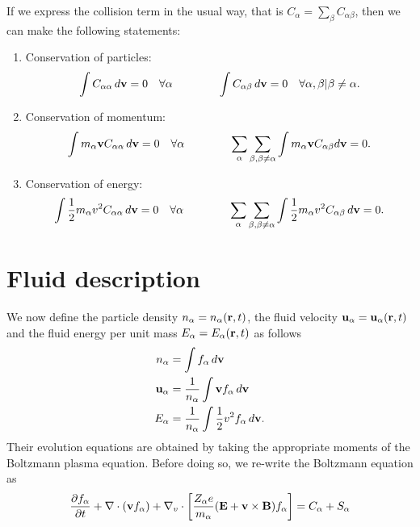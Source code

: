 \documentclass[a4paper,11pt]{report}
\begin{document}
If we express the collision term in the usual way, that is $C_\alpha = \sum_\beta C_{\alpha \beta}$, then we can make the following statements:
\begin{enumerate}
\item Conservation of particles:
\begin{equation}
\int C_{\alpha \alpha} \, d\mathbf{v} = 0 \quad \forall \alpha \qquad \qquad
\int C_{\alpha \beta} \,d\mathbf{v} = 0 \quad \forall \alpha, \beta | \beta \ne \alpha.
\end{equation}

\item Conservation of momentum:
\begin{equation}
\int m_\alpha \mathbf{v} C_{\alpha \alpha} \, d\mathbf{v} = 0 \quad \forall \alpha \qquad \qquad \sum_\alpha \sum_{\beta, \beta \ne \alpha} \int m_\alpha \mathbf{v} C_{\alpha \beta} d\mathbf{v} = 0.
\end{equation}

\item Conservation of energy:
\begin{equation}
\int \frac{1}{2} m_\alpha v^2 C_{\alpha \alpha} \, d\mathbf{v} = 0 \quad \forall \alpha \qquad \qquad \sum_\alpha \sum_{\beta, \beta \ne \alpha} \int \frac{1}{2} m_\alpha v^2 C_{\alpha \beta} \, d\mathbf{v} = 0.
\end{equation}

\end{enumerate}

\section{Fluid description}
We now define the particle density $n_\alpha = n_\alpha(\mathbf{r},t)$, the fluid velocity $\mathbf{u}_\alpha = \mathbf{u}_\alpha(\mathbf{r},t)$ and the fluid energy per unit mass $E_\alpha = E_\alpha(\mathbf{r},t)$ as follows
\begin{align}
n_\alpha &= \int f_\alpha \, d\mathbf{v} \\
\mathbf{u}_\alpha &= \frac{1}{n_\alpha} \int \mathbf{v} f_\alpha \, d\mathbf{v} \\
E_\alpha &= \frac{1}{n_\alpha} \int \frac{1}{2} v^2 f_\alpha \, d\mathbf{v}.
\end{align}
Their evolution equations are obtained by taking the appropriate moments of the Boltzmann plasma equation. Before doing so, we re-write the Boltzmann equation as
\begin{equation}
\label{eq:boltz_mod}
\frac{\partial f_\alpha}{\partial t} + \nabla \cdot (\mathbf{v} f_\alpha) + \nabla_v \cdot \left [ \frac{Z_\alpha e}{m_\alpha} ( \mathbf{E} + \mathbf{v} \times \mathbf{B} ) f_\alpha \right ] = C_\alpha + S_\alpha
\end{equation}
\end{document}
